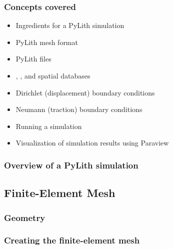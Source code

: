 \documentclass[aspectratio=169]{beamer}
\begin{document}
\begin{frame}
  \frametitle{Concepts covered}
  \summary{}

  \begin{itemize}
  \item Ingredients for a PyLith simulation
  \item PyLith  mesh format
  \item PyLith  files
  \item {}, , and  spatial databases
  \item Dirichlet (displacement) boundary conditions
  \item Neumann (traction) boundary conditions
  \item Running a simulation
  \item Visualization of simulation results using Paraview
  \end{itemize}

\end{frame}


\begin{frame}
  \frametitle{Overview of a PyLith simulation}
  \summary{}

  
\end{frame}


\subsection{Finite-Element Mesh}

\begin{frame}
  \frametitle{Geometry}
  \summary{}

  
\end{frame}


\begin{frame}
  \frametitle{Creating the finite-element mesh}

  
\end{frame}
\end{document}
